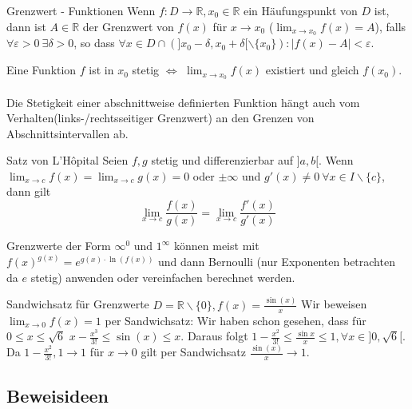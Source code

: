 \documentclass[a4paper,fontsize = 7pt]{scrartcl}
\def\limxo{\lim_{x\to 0}}
\def\R{\mathbb{R}}
\begin{document}
\begin{mainbox}{Grenzwert - Funktionen}
  \vspace{-4pt}
 Wenn $f: D \to \R, x_0 \in \R$ ein Häufungspunkt von $D$ ist, dann ist $A \in \R$ der Grenzwert von $f(x)$ für $x \to x_0$ ($\lim_{x\to x_0} f(x) = A$), falls $\forall \varepsilon > 0 \ \exists \delta > 0$, so dass $\forall x \in D \cap (]x_0 - \delta, x_0 + \delta[ \backslash \{x_0\}): |f(x) - A| < \varepsilon$.
 \vspace{-4pt}
\end{mainbox}
Eine Funktion $f$ ist in $x_0$ stetig $\iff$ $\lim_{x \to x_0} f(x)$ existiert und gleich $f(x_0)$.
\\ \\
Die Stetigkeit einer abschnittweise definierten Funktion hängt auch vom Verhalten(links-/rechtsseitiger Grenzwert) an den Grenzen von Abschnittsintervallen ab.

\begin{subbox}{Satz von L'Hôpital}
  \vspace{-4pt}
  Seien $f,g$ stetig und differenzierbar auf $]a,b[$. Wenn $\lim_{x\to c} f(x) = \lim_{x \to c} g(x) = 0$ oder $\pm \infty$ und $g'(x) \ne 0 \ \forall x \in I \backslash \{c\}$, dann gilt $$\lim_{x\to c} \frac{f(x)}{g(x)} = \lim_{x\to c}\frac{f'(x)}{g'(x)}$$
  \vspace{-12pt}
\end{subbox}

Grenzwerte der Form $\infty^0$ und $1^\infty$ können meist mit $f(x)^{g(x)} = e^{g(x)\cdot \ln(f(x))}$ und dann Bernoulli (nur Exponenten betrachten da $e$ stetig) anwenden oder vereinfachen berechnet werden.

\begin{subbox}{Sandwichsatz für Grenzwerte}
  \vspace{-4pt}
  $D = \R \backslash \{0\}, f(x) = \frac{\sin (x)}{x}$
  Wir beweisen $\limxo f(x) = 1$ per Sandwichsatz:
  Wir haben schon gesehen, dass für $0 \leq x \leq \sqrt{6}$ $x - \frac{x^3}{3!} \leq \sin (x) \leq x$. Daraus folgt $1 - \frac{x^2}{3!} \leq \frac{\sin x}{x} \leq 1, \forall x \in ]0, \sqrt{6}[$.\\
  Da $1 - \frac{x^2}{3!}, 1 \to 1$ für $x \to 0$ gilt per Sandwichsatz $\frac{\sin(x)}{x} \to 1$.
  \vspace{-4pt}
\end{subbox}

\subsection{Beweisideen}%
\end{document}
